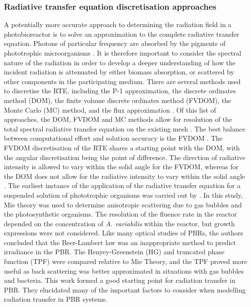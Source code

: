 \subsubsection{Radiative transfer equation discretisation approaches}
\label{S:2.3.2}
A potentially more accurate approach to determining the radiation field in a photobioreactor is to solve an approximation to the complete radiative transfer equation. Photons of particular frequency are absorbed by the pigments of phototrophic microorganisms \cite{mcdermott1995}. It is therefore important to consider the spectral nature of the radiation in order to develop a deeper understanding of how the incident radiation is attenuated by either biomass absorption, or scattered by other components in the participating medium. There are several methods used to discretise the RTE, including the P-1 approximation, the discrete ordinates method (DOM), the finite volume discrete ordinates method (FVDOM), the Monte Carlo (MC) method, and the flux approximation \cite{coelho2008}. Of this list of approaches, the DOM, FVDOM and MC methods allow for resolution of the total spectral radiative transfer equation on the existing mesh \cite{kong2014}. The best balance between computational effort and solution accuracy is the FVDOM \cite{modest2003,kong2014} . The FVDOM discretisation of the RTE shares a starting point with the DOM, with the angular discretisation being the point of difference. The direction of radiative intensity is allowed to vary within the solid angle for the FVDOM, whereas for the DOM does not allow for the radiative intensity to vary within the solid angle \cite{coelho2014}.
\skippingparagraph
The earliest instance of the application of the radiative transfer equation for a suspended solution of phototrophic organisms was carried out by \cite{berberoglu2007}. In this study, Mie theory was used to determine anisotropic scattering due to gas bubbles and the photosynthetic organisms. The resolution of the fluence rate in the reactor depended on the concentration of \textit{A. variabilis} within the reactor, but growth expressions were not considered. Like many optical studies of PBRs, the authors concluded that the Beer-Lambert law was an inappropriate method to predict irradiance in the PBR. The Henyey-Greenstein (HG) and truncated phase function (TPF) were compared relative to Mie Theory, and the TPF proved more useful as back scattering was better approximated in situations with gas bubbles and bacteria. This work formed a good starting point for radiation transfer in PBR. They elucidated many of the important factors to consider when modelling radiation transfer in PBR systems. \skippingparagraph
